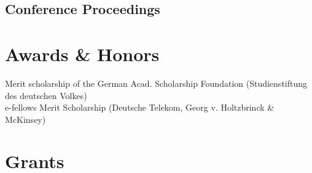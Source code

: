 \documentclass[11pt]{article} %
\begin{document}
\subsection*{Conference Proceedings}




\section*{Awards \& Honors}

Merit scholarship of the German Acad. Scholarship Foundation (Studienstiftung des deutschen Volkes)\\
e-fellows Merit Scholarship (Deutsche Telekom, Georg v. Holtzbrinck \& McKinsey)

\section*{Grants}
\end{document}
